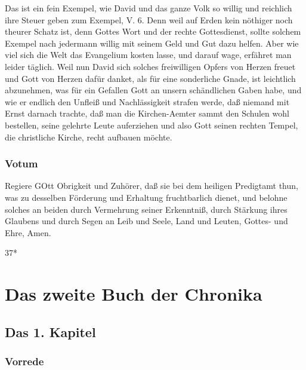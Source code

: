 Das ist ein fein Exempel, wie David und das ganze Volk so willig und reichlich ihre Steuer geben zum Exempel, V. 6. Denn weil auf Erden kein nöthiger noch theurer Schatz ist, denn Gottes Wort und der rechte Gottesdienst, sollte solchem Exempel nach jedermann willig mit seinem Geld und Gut dazu helfen. Aber wie viel sich die Welt das Evangelium kosten lasse, und darauf wage, erfähret man leider täglich. Weil nun David sich solches freiwilligen Opfers von Herzen freuet und Gott von Herzen dafür danket, als für eine sonderliche Gnade, ist leichtlich abzunehmen, was für ein Gefallen Gott an unsern schändlichen Gaben habe, und wie er endlich den Unfleiß und Nachlässigkeit strafen werde, daß niemand mit Ernst darnach trachte, daß man die Kirchen-Aemter sammt den Schulen wohl bestellen, seine gelehrte Leute auferziehen und also Gott seinen rechten Tempel, die christliche Kirche, recht aufbauen möchte.

\section{Votum}

Regiere GOtt Obrigkeit und Zuhörer, daß sie bei dem heiligen Predigtamt thun, was zu desselben Förderung und Erhaltung fruchtbarlich dienet, und belohne solches an beiden durch Vermehrung seiner Erkenntniß, durch Stärkung ihres Glaubens und durch Segen an Leib und Seele, Land und Leuten, Gottes- und Ehre, Amen.

37*

\part{Das zweite Buch der Chronika}

\chapter{Das 1. Kapitel}

\section{Vorrede}


